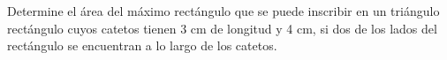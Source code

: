 \item Determine el área del máximo rectángulo que se puede inscribir en un triángulo rectángulo cuyos catetos tienen 3 cm de longitud y 4 cm, si dos de los lados del rectángulo se encuentran a lo largo de los catetos.
